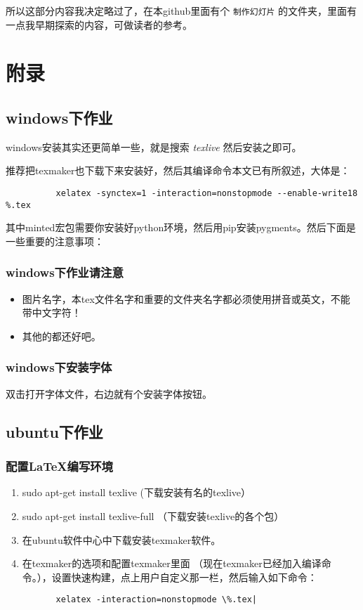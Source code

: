 \documentclass[11pt,oneside]{book}
\begin{document}
        所以这部分内容我决定略过了，在本github里面有个 \verb+制作幻灯片+ 的文件夹，里面有一点我早期探索的内容，可做读者的参考。




        \appendix
        \part{附录}


        \chapter{windows下作业}
        windows安装其实还更简单一些，就是搜索 \emph{texlive} 然后安装之即可。

        推荐把texmaker也下载下来安装好，然后其编译命令本文已有所叙述，大体是：
        \begin{Verbatim}
          xelatex -synctex=1 -interaction=nonstopmode --enable-write18 %.tex
        \end{Verbatim}

        其中minted宏包需要你安装好python环境，然后用pip安装pygments。然后下面是一些重要的注意事项：

        \section{windows下作业请注意}
        \begin{itemize}
        \item 图片名字，本tex文件名字和重要的文件夹名字都必须使用拼音或英文，不能带中文字符！
        \item 其他的都还好吧。
        \end{itemize}


        \section{windows下安装字体}
        双击打开字体文件，右边就有个安装字体按钮。


        \chapter{ubuntu下作业}
        \section{配置\LaTeX 编写环境}
        \label{sec-8}
        \begin{enumerate}
        \item sudo apt-get install texlive   (下载安装有名的texlive）
        \item sudo apt-get install texlive-full   （下载安装texlive的各个包）
        \item 在ubuntu软件中心中下载安装texmaker软件。
        \item 在texmaker的选项和配置texmaker里面 （现在texmaker已经加入\XeLaTeX 编译命令。），设置快速构建，点上用户自定义那一栏，然后输入如下命令：
        \end{enumerate}
        \begin{Verbatim}
          xelatex -interaction=nonstopmode \%.tex|
        \end{Verbatim}
\end{document}
